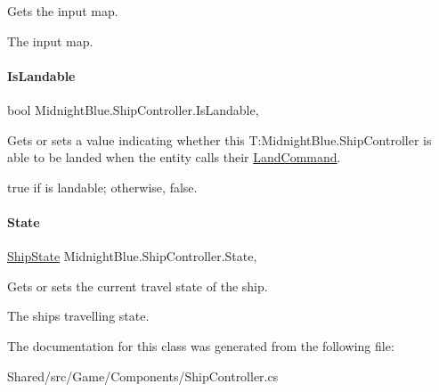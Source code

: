 Gets the input map. 

The input map.\hypertarget{class_midnight_blue_1_1_ship_controller_ad07cfa737db5a712aedcc2528b953683}{}\label{class_midnight_blue_1_1_ship_controller_ad07cfa737db5a712aedcc2528b953683} 
\paragraph{\texorpdfstring{Is\+Landable}{IsLandable}}
{\footnotesize\ttfamily bool Midnight\+Blue.\+Ship\+Controller.\+Is\+Landable\hspace{0.3cm}{\ttfamily [get]}, {\ttfamily [set]}}



Gets or sets a value indicating whether this T\+:\+Midnight\+Blue.\+Ship\+Controller is able to be landed when the entity calls their \hyperlink{class_midnight_blue_1_1_land_command}{Land\+Command}. 

{\ttfamily true} if is landable; otherwise, {\ttfamily false}.\hypertarget{class_midnight_blue_1_1_ship_controller_a032da447be3b66b7998349ae825d4edb}{}\label{class_midnight_blue_1_1_ship_controller_a032da447be3b66b7998349ae825d4edb} 
\paragraph{\texorpdfstring{State}{State}}
{\footnotesize\ttfamily \hyperlink{namespace_midnight_blue_a46fd3250d826e0dec67892328d5b368c}{Ship\+State} Midnight\+Blue.\+Ship\+Controller.\+State\hspace{0.3cm}{\ttfamily [get]}, {\ttfamily [set]}}



Gets or sets the current travel state of the ship. 

The ships travelling state.

The documentation for this class was generated from the following file\+:\begin{DoxyCompactItemize}
\item 
Shared/src/\+Game/\+Components/Ship\+Controller.\+cs\end{DoxyCompactItemize}
